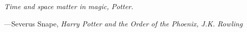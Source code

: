 \cleardoublepage
\thispagestyle{plain}

\vspace*{5cm}
\epigraph{\itshape Time and space matter in magic, Potter.}{---Severus Snape, \textit{Harry Potter and the Order of the Phoenix, J.K. Rowling}}
